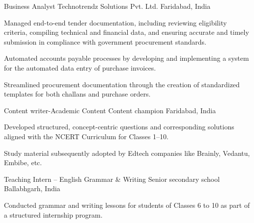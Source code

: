 

\begin{cventries}

  \cventry
    {Business Analyst} %
    {Technotrendz Solutions Pvt. Ltd.} %
    {Faridabad, India} %
    {} %
    {
      \begin{cvitems} %
        \item {Managed end-to-end tender documentation, including reviewing eligibility criteria, compiling technical and financial data, and ensuring accurate and timely submission in compliance with government procurement standards.}
        \item {Automated accounts payable processes by developing and implementing a system for the automated data entry of purchase invoices.}
        \item {Streamlined procurement documentation through the creation of standardized templates for both challans and purchase orders.}
      \end{cvitems}
    }

  \cventry
    {Content writer-Academic Content} %
    {Content champion} %
    {Faridabad, India} %
    {} %
    {
      \begin{cvitems} %
        \item {Developed structured, concept-centric questions and corresponding solutions aligned with the NCERT Curriculum for Classes 1–10.}
        \item {Study material subsequently adopted by Edtech companies like Brainly, Vedantu, Embibe, etc.}
      \end{cvitems}
    }

  \cventry
    {Teaching Intern – English Grammar \& Writing} %
    {Senior secondary school} %
    {Ballabhgarh, India} %
    {} %
    {
      \begin{cvitems} %
        \item {Conducted grammar and writing lessons for students of Classes 6 to 10 as part of a structured internship program.}
      \end{cvitems}
    }
\end{cventries}
